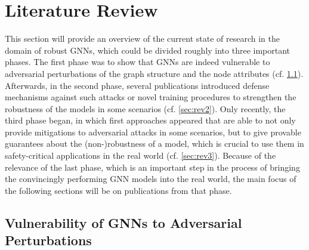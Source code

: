 \documentclass[a4paper,preprint]{sig-alternate}
\begin{document}
\vfill
\pagebreak

\section{Literature Review}
\label{sec:literature}

This section will provide an overview of the current state of research in the domain of robust GNNs, which could be divided
roughly into three important phases.
The first phase was to show that GNNs are indeed vulnerable to adversarial perturbations of the graph structure and the node attributes (cf. \ref{sec:rev1}).
Afterwards, in the second phase, several publications introduced defense mechanisms against such attacks or novel training procedures 
to strengthen the robustness of the models in some scenarios (cf. \ref{sec:rev2}). Only recently, the third phase began, in which first approaches appeared
that are able to not only provide mitigations to adversarial attacks in some scenarios, but to give provable guarantees about the (non-)robustness 
of a model, which is crucial to use them in safety-critical applications in the real world (cf. \ref{sec:rev3}). Because of the relevance of the last phase, 
which is an important step in the process of bringing the convincingly performing GNN models into the real world, the main focus of the following sections
will be on publications from that phase.

\subsection{Vulnerability of GNNs to Adversarial Perturbations}
\label{sec:rev1}
\end{document}
